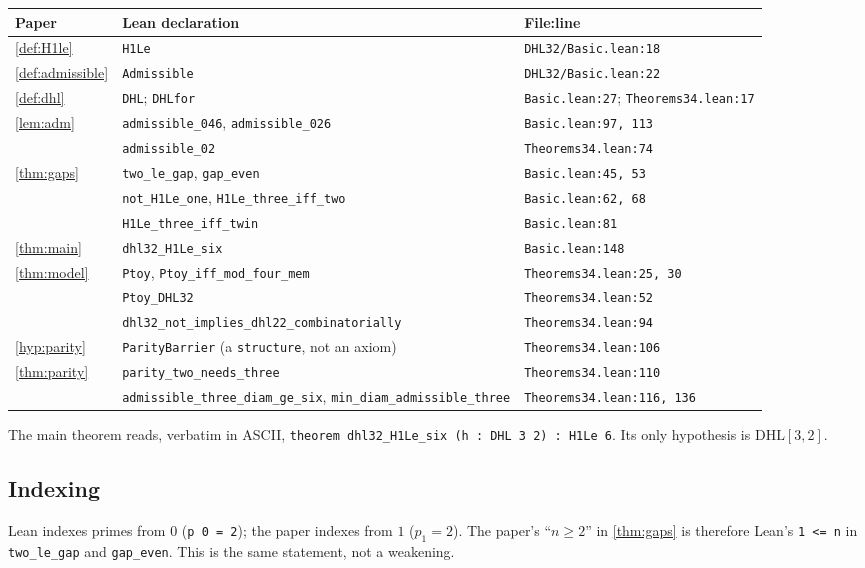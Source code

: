 \documentclass[11pt]{amsart}
\theoremstyle{plain}
\theoremstyle{definition}
\theoremstyle{remark}
\newcommand{\DHL}{\mathrm{DHL}}
\begin{document}
{\footnotesize
\begin{center}
\begin{tabular}{lll}
\hline
Paper & Lean declaration & File:line \\
\hline
\cref{def:H1le} & \texttt{H1Le} & \texttt{DHL32/Basic.lean:18} \\
\cref{def:admissible} & \texttt{Admissible} & \texttt{DHL32/Basic.lean:22} \\
\cref{def:dhl} & \texttt{DHL}; \texttt{DHLfor} & \texttt{Basic.lean:27}; \texttt{Theorems34.lean:17} \\
\cref{lem:adm} & \texttt{admissible\_046}, \texttt{admissible\_026} & \texttt{Basic.lean:97, 113} \\
 & \texttt{admissible\_02} & \texttt{Theorems34.lean:74} \\
\cref{thm:gaps} & \texttt{two\_le\_gap}, \texttt{gap\_even} & \texttt{Basic.lean:45, 53} \\
 & \texttt{not\_H1Le\_one}, \texttt{H1Le\_three\_iff\_two} & \texttt{Basic.lean:62, 68} \\
 & \texttt{H1Le\_three\_iff\_twin} & \texttt{Basic.lean:81} \\
\cref{thm:main} & \texttt{dhl32\_H1Le\_six} & \texttt{Basic.lean:148} \\
\cref{thm:model} & \texttt{Ptoy}, \texttt{Ptoy\_iff\_mod\_four\_mem} & \texttt{Theorems34.lean:25, 30} \\
 & \texttt{Ptoy\_DHL32} & \texttt{Theorems34.lean:52} \\
 & \texttt{dhl32\_not\_implies\_dhl22\_combinatorially} & \texttt{Theorems34.lean:94} \\
\cref{hyp:parity} & \texttt{ParityBarrier} (a \texttt{structure}, not an axiom) & \texttt{Theorems34.lean:106} \\
\cref{thm:parity} & \texttt{parity\_two\_needs\_three} & \texttt{Theorems34.lean:110} \\
 & \texttt{admissible\_three\_diam\_ge\_six}, \texttt{min\_diam\_admissible\_three} & \texttt{Theorems34.lean:116, 136} \\
\hline
\end{tabular}
\end{center}}

The main theorem reads, verbatim in ASCII, \texttt{theorem dhl32\_H1Le\_six (h : DHL 3 2) : H1Le 6}. Its only hypothesis is $\DHL[3,2]$.

\subsection*{Indexing}
Lean indexes primes from $0$ (\texttt{p 0 = 2}); the paper indexes from $1$ ($p_1=2$). The paper's ``$n\ge2$'' in \cref{thm:gaps} is therefore Lean's \texttt{1 <= n} in \texttt{two\_le\_gap} and \texttt{gap\_even}. This is the same statement, not a weakening.
\end{document}
